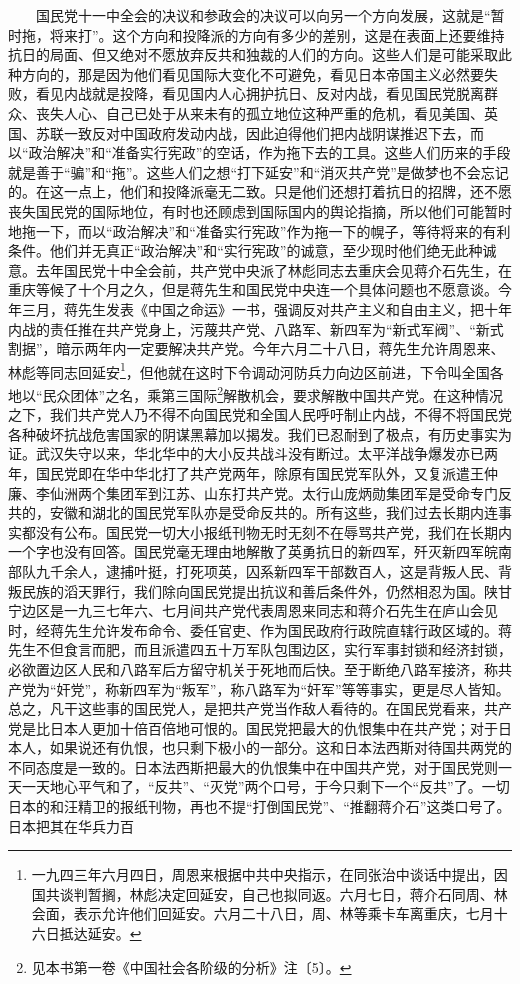 \documentclass[cn,11pt,chinese]{elegantbook}
\begin{document}
　　国民党十一中全会的决议和参政会的决议可以向另一个方向发展，这就是“暂时拖，将来打”。这个方向和投降派的方向有多少的差别，这是在表面上还要维持抗日的局面、但又绝对不愿放弃反共和独裁的人们的方向。这些人们是可能采取此种方向的，那是因为他们看见国际大变化不可避免，看见日本帝国主义必然要失败，看见内战就是投降，看见国内人心拥护抗日、反对内战，看见国民党脱离群众、丧失人心、自己已处于从来未有的孤立地位这种严重的危机，看见美国、英国、苏联一致反对中国政府发动内战，因此迫得他们把内战阴谋推迟下去，而以“政治解决”和“准备实行宪政”的空话，作为拖下去的工具。这些人们历来的手段就是善于“骗”和“拖”。这些人们之想“打下延安”和“消灭共产党”是做梦也不会忘记的。在这一点上，他们和投降派毫无二致。只是他们还想打着抗日的招牌，还不愿丧失国民党的国际地位，有时也还顾虑到国际国内的舆论指摘，所以他们可能暂时地拖一下，而以“政治解决”和“准备实行宪政”作为拖一下的幌子，等待将来的有利条件。他们并无真正“政治解决”和“实行宪政”的诚意，至少现时他们绝无此种诚意。去年国民党十中全会前，共产党中央派了林彪同志去重庆会见蒋介石先生，在重庆等候了十个月之久，但是蒋先生和国民党中央连一个具体问题也不愿意谈。今年三月，蒋先生发表《中国之命运》一书，强调反对共产主义和自由主义，把十年内战的责任推在共产党身上，污蔑共产党、八路军、新四军为“新式军阀”、“新式割据”，暗示两年内一定要解决共产党。今年六月二十八日，蒋先生允许周恩来、林彪等同志回延安\footnote[4]{ 一九四三年六月四日，周恩来根据中共中央指示，在同张治中谈话中提出，因国共谈判暂搁，林彪决定回延安，自己也拟同返。六月七日，蒋介石同周、林会面，表示允许他们回延安。六月二十八日，周、林等乘卡车离重庆，七月十六日抵达延安。}，但他就在这时下令调动河防兵力向边区前进，下令叫全国各地以“民众团体”之名，乘第三国际\footnote[5]{ 见本书第一卷《中国社会各阶级的分析》注〔5〕。}解散机会，要求解散中国共产党。在这种情况之下，我们共产党人乃不得不向国民党和全国人民呼吁制止内战，不得不将国民党各种破坏抗战危害国家的阴谋黑幕加以揭发。我们已忍耐到了极点，有历史事实为证。武汉失守以来，华北华中的大小反共战斗没有断过。太平洋战争爆发亦已两年，国民党即在华中华北打了共产党两年，除原有国民党军队外，又复派遣王仲廉、李仙洲两个集团军到江苏、山东打共产党。太行山庞炳勋集团军是受命专门反共的，安徽和湖北的国民党军队亦是受命反共的。所有这些，我们过去长期内连事实都没有公布。国民党一切大小报纸刊物无时无刻不在辱骂共产党，我们在长期内一个字也没有回答。国民党毫无理由地解散了英勇抗日的新四军，歼灭新四军皖南部队九千余人，逮捕叶挺，打死项英，囚系新四军干部数百人，这是背叛人民、背叛民族的滔天罪行，我们除向国民党提出抗议和善后条件外，仍然相忍为国。陕甘宁边区是一九三七年六、七月间共产党代表周恩来同志和蒋介石先生在庐山会见时，经蒋先生允许发布命令、委任官吏、作为国民政府行政院直辖行政区域的。蒋先生不但食言而肥，而且派遣四五十万军队包围边区，实行军事封锁和经济封锁，必欲置边区人民和八路军后方留守机关于死地而后快。至于断绝八路军接济，称共产党为“奸党”，称新四军为“叛军”，称八路军为“奸军”等等事实，更是尽人皆知。总之，凡干这些事的国民党人，是把共产党当作敌人看待的。在国民党看来，共产党是比日本人更加十倍百倍地可恨的。国民党把最大的仇恨集中在共产党；对于日本人，如果说还有仇恨，也只剩下极小的一部分。这和日本法西斯对待国共两党的不同态度是一致的。日本法西斯把最大的仇恨集中在中国共产党，对于国民党则一天一天地心平气和了，“反共”、“灭党”两个口号，于今只剩下一个“反共”了。一切日本的和汪精卫的报纸刊物，再也不提“打倒国民党”、“推翻蒋介石”这类口号了。日本把其在华兵力百
\end{document}
